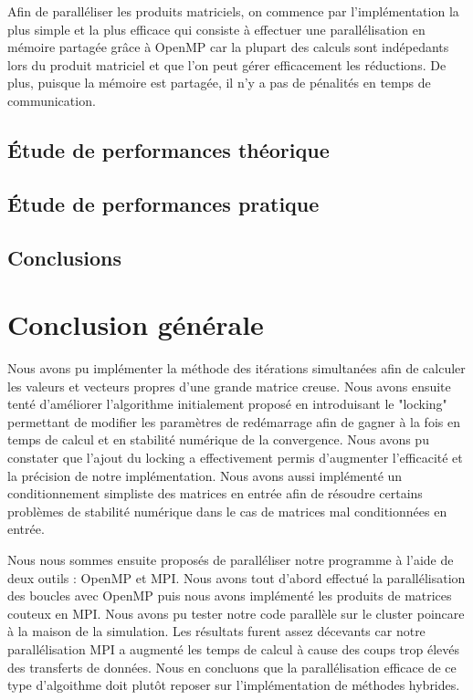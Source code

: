 \documentclass[11pt,a4paper]{article}
\begin{document}
		Afin de paralléliser les produits matriciels, on commence par l'implémentation la plus simple et la plus efficace qui consiste à effectuer une parallélisation en mémoire partagée grâce à OpenMP car la plupart des calculs sont indépedants lors du produit matriciel et que l'on peut gérer efficacement les réductions. De plus, puisque la mémoire est partagée, il n'y a pas de pénalités en temps de communication.

	\subsection{Étude de performances théorique}
	\subsection{Étude de performances pratique}
	\subsection{Conclusions}

\section{Conclusion générale}

	Nous avons pu implémenter la méthode des itérations simultanées afin de calculer les valeurs et vecteurs propres d'une grande matrice creuse. Nous avons ensuite tenté d'améliorer l'algorithme initialement proposé en introduisant le "locking" permettant de modifier les paramètres de redémarrage afin de gagner à la fois en temps de calcul et en stabilité numérique de la convergence. Nous avons pu constater que l'ajout du locking a effectivement permis d'augmenter l'efficacité et la précision de notre implémentation. Nous avons aussi implémenté un conditionnement simpliste des matrices en entrée afin de résoudre certains problèmes de stabilité numérique dans le cas de matrices mal conditionnées en entrée.

	Nous nous sommes ensuite proposés de paralléliser notre programme à l'aide de deux outils : OpenMP et MPI. Nous avons tout d'abord effectué la parallélisation des boucles avec OpenMP puis nous avons implémenté les produits de matrices couteux en MPI. Nous avons pu tester notre code parallèle sur le cluster poincare à la maison de la simulation. Les résultats furent assez décevants car notre parallélisation MPI a augmenté les temps de calcul à cause des coups trop élevés des transferts de données. Nous en concluons que la parallélisation efficace de ce type d'algoithme doit plutôt reposer sur l'implémentation de méthodes hybrides.
\end{document}
